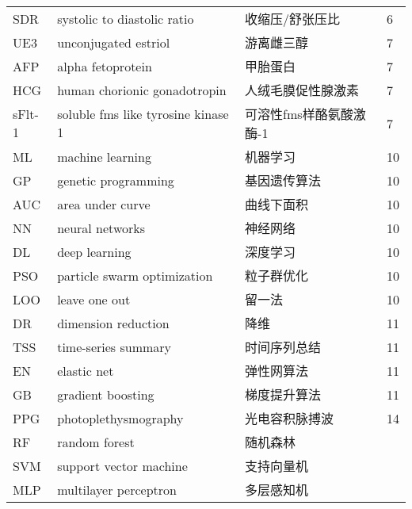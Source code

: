 \begin{center}
\begin{longtable}{m{2cm}m{7cm}m{5cm}m{1cm}<{\centering}}
        SDR     &  systolic to diastolic ratio & 收缩压/舒张压比 & 6\\
        UE3     & unconjugated estriol & 游离雌三醇 & 7\\
        AFP     & alpha fetoprotein     & 甲胎蛋白 & 7 \\
        HCG     & human chorionic gonadotropin  & 人绒毛膜促性腺激素    & 7 \\
        sFlt-1  & soluble fms like tyrosine kinase 1    & 可溶性fms样酪氨酸激酶-1 & 7\\
        ML     & machine learning  & 机器学习  & 10    \\
        GP  & genetic programming   & 基因遗传算法  &10 \\
        AUC & area under curve & 曲线下面积 & 10 \\
        NN & neural networks & 神经网络 & 10 \\
        DL & deep learning & 深度学习 & 10 \\
        PSO & particle swarm optimization & 粒子群优化 & 10 \\
        LOO & leave one out & 留一法 & 10 \\
        DR  & dimension reduction & 降维 & 11 \\
        TSS & time-series summary & 时间序列总结 & 11 \\
        EN & elastic net  & 弹性网算法 & 11 \\
        GB &  gradient boosting  & 梯度提升算法 & 11 \\
        PPG & photoplethysmography & 光电容积脉搏波 & 14 \\
        
        RF&random forest&随机森林\\
        SVM&support vector machine&支持向量机\\
        MLP&multilayer perceptron&多层感知机\\
	\end{longtable}
\end{center}